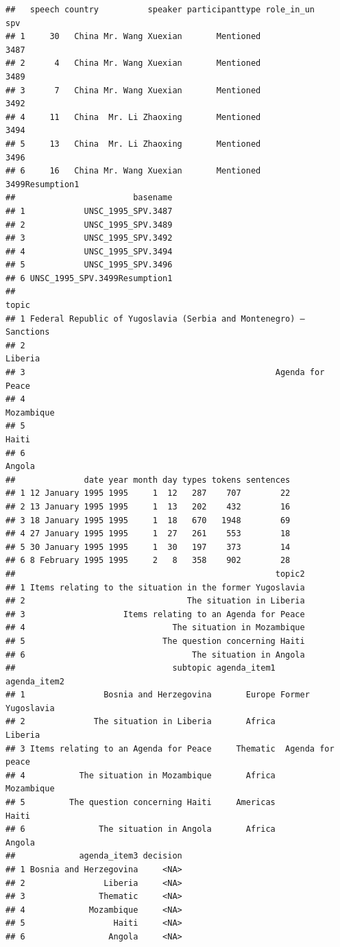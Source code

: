 \documentclass[
]{article}
\begin{document}
\begin{verbatim}
##   speech country          speaker participanttype role_in_un             spv
## 1     30   China Mr. Wang Xuexian       Mentioned                       3487
## 2      4   China Mr. Wang Xuexian       Mentioned                       3489
## 3      7   China Mr. Wang Xuexian       Mentioned                       3492
## 4     11   China  Mr. Li Zhaoxing       Mentioned                       3494
## 5     13   China  Mr. Li Zhaoxing       Mentioned                       3496
## 6     16   China Mr. Wang Xuexian       Mentioned            3499Resumption1
##                        basename
## 1            UNSC_1995_SPV.3487
## 2            UNSC_1995_SPV.3489
## 3            UNSC_1995_SPV.3492
## 4            UNSC_1995_SPV.3494
## 5            UNSC_1995_SPV.3496
## 6 UNSC_1995_SPV.3499Resumption1
##                                                                topic
## 1 Federal Republic of Yugoslavia (Serbia and Montenegro) — Sanctions
## 2                                                            Liberia
## 3                                                   Agenda for Peace
## 4                                                         Mozambique
## 5                                                              Haiti
## 6                                                             Angola
##              date year month day types tokens sentences
## 1 12 January 1995 1995     1  12   287    707        22
## 2 13 January 1995 1995     1  13   202    432        16
## 3 18 January 1995 1995     1  18   670   1948        69
## 4 27 January 1995 1995     1  27   261    553        18
## 5 30 January 1995 1995     1  30   197    373        14
## 6 8 February 1995 1995     2   8   358    902        28
##                                                     topic2
## 1 Items relating to the situation in the former Yugoslavia
## 2                                 The situation in Liberia
## 3                    Items relating to an Agenda for Peace
## 4                              The situation in Mozambique
## 5                            The question concerning Haiti
## 6                                  The situation in Angola
##                                subtopic agenda_item1      agenda_item2
## 1                Bosnia and Herzegovina       Europe Former Yugoslavia
## 2              The situation in Liberia       Africa           Liberia
## 3 Items relating to an Agenda for Peace     Thematic  Agenda for peace
## 4           The situation in Mozambique       Africa        Mozambique
## 5         The question concerning Haiti     Americas             Haiti
## 6               The situation in Angola       Africa            Angola
##             agenda_item3 decision
## 1 Bosnia and Herzegovina     <NA>
## 2                Liberia     <NA>
## 3               Thematic     <NA>
## 4             Mozambique     <NA>
## 5                  Haiti     <NA>
## 6                 Angola     <NA>
\end{verbatim}
\end{document}
